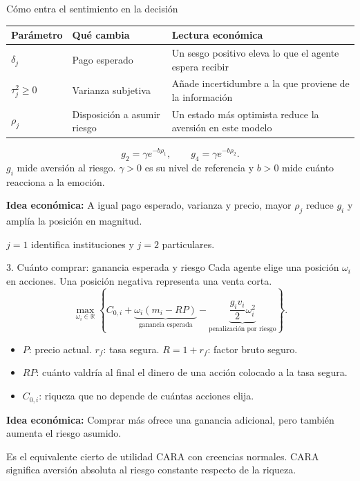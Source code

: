 \documentclass[aspectratio=169,11pt]{beamer}
\newcommand{\idea}[1]{\par\medskip\textbf{Idea económica:} #1}
\begin{document}
\begin{frame}{Cómo entra el sentimiento en la decisión}
 \begin{center}
 \begin{tabular}{p{2.7cm}p{3.4cm}p{5.9cm}}
 \toprule
 Parámetro & Qué cambia & Lectura económica\\
 \midrule
 \(\delta_j\) & Pago esperado & Un sesgo positivo eleva lo que el agente espera recibir\\[0.15cm]
 \(\tau_j^2\geq0\) & Varianza subjetiva & Añade incertidumbre a la que proviene de la información\\[0.15cm]
 \(\rho_j\) & Disposición a asumir riesgo & Un estado más optimista reduce la aversión en este modelo\\
 \bottomrule
 \end{tabular}
 \end{center}
 \[
  g_2=\gamma e^{-b\rho_1},\qquad g_4=\gamma e^{-b\rho_2}.
 \]
 \(g_i\) mide aversión al riesgo. \(\gamma>0\) es su nivel de referencia
 y \(b>0\) mide cuánto reacciona a la emoción.
 \idea{A igual pago esperado, varianza y precio, mayor \(\rho_j\) reduce \(g_i\) y amplía la posición en magnitud.}
 \small\par\medskip
 \(j=1\) identifica instituciones y \(j=2\) particulares.
\end{frame}
\begin{frame}{3. Cuánto comprar: ganancia esperada y riesgo}
 Cada agente elige una posición \(\omega_i\) en acciones.
 Una posición negativa representa una venta corta.
 \[
  \max_{\omega_i\in\mathbb R}
  \left\{C_{0,i}
  +\underbrace{\omega_i(m_i-RP)}_{\text{ganancia esperada}}
  -\underbrace{\frac{g_iv_i}{2}\omega_i^2}_{\text{penalización por riesgo}}\right\}.
 \]
 \begin{itemize}
  \item \(P\): precio actual. \(r_f\): tasa segura. \(R=1+r_f\): factor bruto seguro.
  \item \(RP\): cuánto valdría al final el dinero de una acción colocado a la tasa segura.
  \item \(C_{0,i}\): riqueza que no depende de cuántas acciones elija.
 \end{itemize}
 \idea{Comprar más ofrece una ganancia adicional, pero también aumenta el riesgo asumido.}
 \small\par\medskip
 Es el equivalente cierto de utilidad CARA con creencias normales.
 CARA significa aversión absoluta al riesgo constante respecto de la riqueza.
\end{frame}
\end{document}
